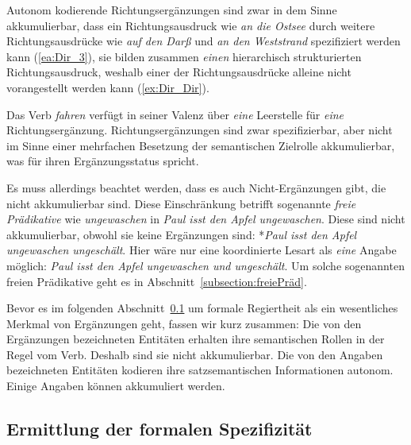 Autonom kodierende Richtungsergänzungen sind zwar in dem Sinne akkumulierbar, dass ein Richtungsausdruck wie \textit{an die Ostsee} durch weitere Richtungsausdrücke wie \textit{auf den Darß} und \textit{an den Weststrand} spezifiziert werden kann (\ref{ea:Dir_3}), sie bilden zusammen \textit{einen} hierarchisch strukturierten Richtungsausdruck, weshalb einer der Richtungsausdrücke alleine nicht vorangestellt werden kann (\ref{ex:Dir_Dir}).

\ea \label{ea:Akkum_Dir}
 \label{ea:Dir_3}
 \label{ex:Dir_Dir}
\z 
\z 

Das Verb \textit{fahren} verfügt in seiner Valenz über \textit{eine} Leerstelle für \textit{eine} Richtungsergänzung. Richtungsergänzungen sind zwar spezifizierbar, aber nicht im Sinne einer mehrfachen Besetzung der semantischen Zielrolle akkumulierbar, was für ihren Ergänzungsstatus spricht. 

Es muss allerdings beachtet werden, dass es auch Nicht-Ergänzungen gibt, die nicht akkumulierbar sind. Diese Einschränkung betrifft \zB sogenannte \textit{freie Prädikative} wie \textit{ungewaschen} in \textit{Paul isst den Apfel ungewaschen}. Diese sind nicht akkumulierbar, obwohl sie keine Ergänzungen sind: *\textit{Paul isst den Apfel ungewaschen ungeschält}. Hier wäre nur eine koordinierte Lesart als \textit{eine} Angabe möglich: \textit{Paul isst den Apfel ungewaschen und ungeschält}. Um solche sogenannten freien Prädikative geht es in Abschnitt~\ref{subsection:freiePräd}.

Bevor es im folgenden Abschnitt~\ref{subsubsection:TestFOSP} um formale Regiertheit als ein wesentliches Merkmal von Ergänzungen geht, fassen wir kurz zusammen: Die von den Ergänzungen bezeichneten Entitäten erhalten ihre semantischen Rollen in der Regel vom Verb. Deshalb sind sie nicht akkumulierbar. Die von den Angaben bezeichneten Entitäten kodieren ihre satzsemantischen Informationen autonom. Einige Angaben können akkumuliert werden.


\subsection{Ermittlung der formalen Spezifizität}\label{subsubsection:TestFOSP}

